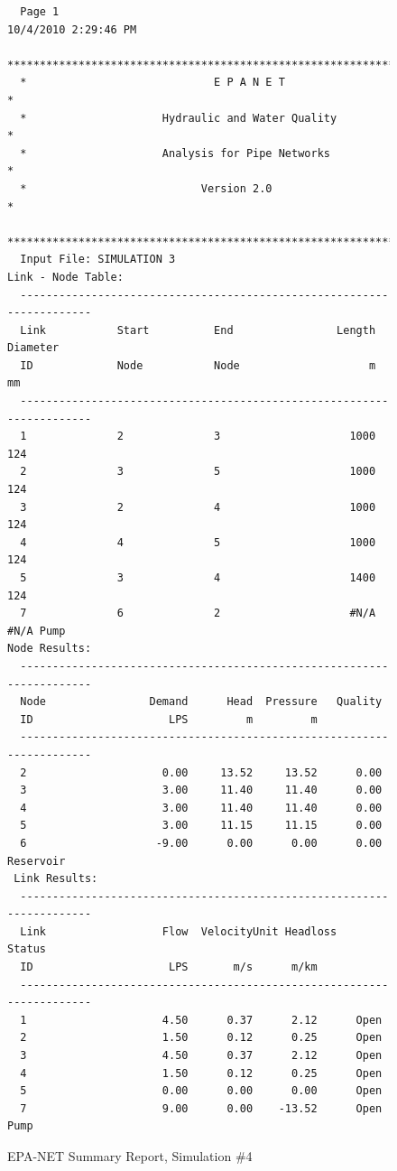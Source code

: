 \documentclass[11pt]{article}
\begin{document}
\begin{enumerate}
\begin{figure}[ht!] %
\centering

\begin{verbatim}
  Page 1                                            10/4/2010 2:29:46 PM
  **********************************************************************
  *                             E P A N E T                            *
  *                     Hydraulic and Water Quality                    *
  *                     Analysis for Pipe Networks                     *
  *                           Version 2.0                              *
  **********************************************************************
  Input File: SIMULATION 3
Link - Node Table:
  ----------------------------------------------------------------------
  Link           Start          End                Length  Diameter
  ID             Node           Node                    m        mm
  ----------------------------------------------------------------------
  1              2              3                    1000       124
  2              3              5                    1000       124
  3              2              4                    1000       124
  4              4              5                    1000       124
  5              3              4                    1400       124
  7              6              2                    #N/A      #N/A Pump
Node Results:
  ----------------------------------------------------------------------
  Node                Demand      Head  Pressure   Quality
  ID                     LPS         m         m          
  ----------------------------------------------------------------------
  2                     0.00     13.52     13.52      0.00
  3                     3.00     11.40     11.40      0.00
  4                     3.00     11.40     11.40      0.00
  5                     3.00     11.15     11.15      0.00
  6                    -9.00      0.00      0.00      0.00 Reservoir
 Link Results:
  ----------------------------------------------------------------------
  Link                  Flow  VelocityUnit Headloss    Status
  ID                     LPS       m/s      m/km
  ----------------------------------------------------------------------
  1                     4.50      0.37      2.12      Open
  2                     1.50      0.12      0.25      Open
  3                     4.50      0.37      2.12      Open
  4                     1.50      0.12      0.25      Open
  5                     0.00      0.00      0.00      Open
  7                     9.00      0.00    -13.52      Open Pump
  \end{verbatim}
     \caption{EPA-NET Summary Report, Simulation \#4}
   \label{fig:epanet4} 
\end{figure}
\clearpage


\end{enumerate}
\end{document}

